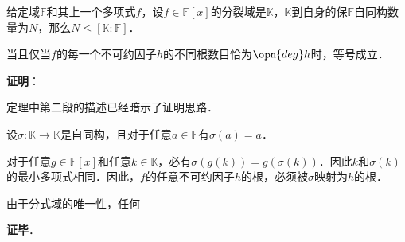 \begin{theorem}{}
给定域$\mathbb{F}$和其上一个多项式$f$，设$f\in\mathbb{F}[x]$的分裂域是$\mathbb{K}$，$\mathbb{K}$到自身的保$\mathbb{F}$自同构数量为$N$，那么$N\leq[\mathbb{K}:\mathbb{F}]$．

当且仅当$f$的每一个不可约因子$h$的不同根数目恰为$\opn{deg}h$时，等号成立．
\end{theorem}

\textbf{证明}：

定理中第二段的描述已经暗示了证明思路．

设$\sigma:\mathbb{K}\to\mathbb{K}$是自同构，且对于任意$a\in\mathbb{F}$有$\sigma(a)=a$．

对于任意$g\in\mathbb{F}[x]$和任意$k\in\mathbb{K}$，必有$\sigma(g(k))=g(\sigma(k))$．因此$k$和$\sigma(k)$的最小多项式相同．因此，$f$的任意不可约因子$h$的根，必须被$\sigma$映射为$h$的根．

由于分式域的唯一性，任何

\textbf{证毕}．


















